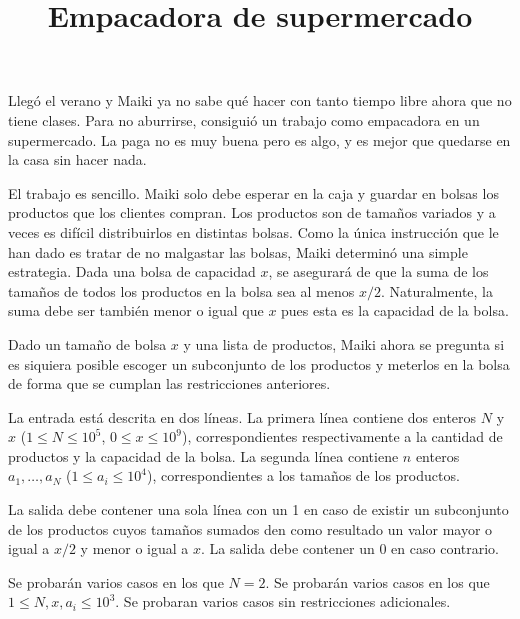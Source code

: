 \documentclass{oci}
\title{Empacadora de supermercado}
\begin{document}
\begin{problemDescription}
Llegó el verano y Maiki ya no sabe qué hacer con tanto tiempo libre ahora que no tiene clases.
Para no aburrirse, consiguió un trabajo como empacadora en un supermercado.
La paga no es muy buena pero es algo, y es mejor que quedarse en la casa sin hacer nada.

El trabajo es sencillo.
Maiki solo debe esperar en la caja y guardar en bolsas los productos que los clientes compran.
Los productos son de tamaños variados y a veces es difícil distribuirlos
en distintas bolsas.
Como la única instrucción que le han dado es tratar de no malgastar las bolsas,
Maiki determinó una simple estrategia.
Dada una bolsa de capacidad $x$, se asegurará de que la suma de los tamaños de todos los productos
en la bolsa sea al menos $x/2$.
Naturalmente, la suma debe ser también menor o igual que $x$ pues esta es la capacidad
de la bolsa.

Dado un tamaño de bolsa $x$ y una lista de productos, Maiki ahora se pregunta si es siquiera
posible escoger un subconjunto de los productos y meterlos en la bolsa de forma que se cumplan
las restricciones anteriores.

\end{problemDescription}

\begin{inputDescription}
La entrada está descrita en dos líneas.
La primera línea contiene dos enteros $N$ y $x$ ($1\leq N\leq 10^5$, $0 \leq x \leq 10^9$),
correspondientes respectivamente a la cantidad de productos y la capacidad de la bolsa.
La segunda línea contiene $n$ enteros $a_1,\ldots, a_N$ ($1\leq a_i\leq 10^4$), correspondientes
a los tamaños de los productos.
\end{inputDescription}

\begin{outputDescription}
La salida debe contener una sola línea con un 1 en caso de existir un subconjunto de los productos
cuyos tamaños sumados den como resultado un valor mayor o igual a $x/2$ y menor o igual a $x$. 
La salida debe contener un 0 en caso contrario.
\end{outputDescription}

\begin{scoreDescription}
  Se probarán varios casos en los que $N = 2$.
  Se probarán varios casos en los que $1 \leq N, x, a_i \leq 10^3$.
  Se probaran varios casos sin restricciones adicionales.
\end{scoreDescription}

\begin{sampleDescription}
\end{sampleDescription}
\end{document}
